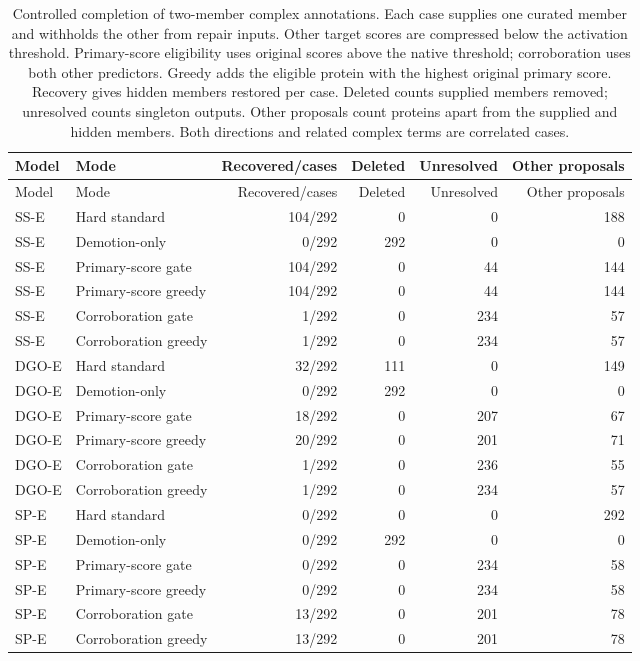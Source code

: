 \begingroup\scriptsize
\setlength{\tabcolsep}{4pt}
\begin{longtable}{llrrrr}
\caption{Controlled completion of two-member complex annotations. Each case supplies one curated member and withholds the other from repair inputs. Other target scores are compressed below the activation threshold. Primary-score eligibility uses original scores above the native threshold; corroboration uses both other predictors. Greedy adds the eligible protein with the highest original primary score. Recovery gives hidden members restored per case. Deleted counts supplied members removed; unresolved counts singleton outputs. Other proposals count proteins apart from the supplied and hidden members. Both directions and related complex terms are correlated cases.}\label{tab:supp-targeted-recovery}\\
\toprule
Model & Mode & Recovered/cases & Deleted & Unresolved & Other proposals \\
\midrule
\endfirsthead
\toprule
Model & Mode & Recovered/cases & Deleted & Unresolved & Other proposals \\
\midrule
\endhead
SS-E & Hard standard & 104/292 & 0 & 0 & 188 \\
SS-E & Demotion-only & 0/292 & 292 & 0 & 0 \\
SS-E & Primary-score gate & 104/292 & 0 & 44 & 144 \\
SS-E & Primary-score greedy & 104/292 & 0 & 44 & 144 \\
SS-E & Corroboration gate & 1/292 & 0 & 234 & 57 \\
SS-E & Corroboration greedy & 1/292 & 0 & 234 & 57 \\
DGO-E & Hard standard & 32/292 & 111 & 0 & 149 \\
DGO-E & Demotion-only & 0/292 & 292 & 0 & 0 \\
DGO-E & Primary-score gate & 18/292 & 0 & 207 & 67 \\
DGO-E & Primary-score greedy & 20/292 & 0 & 201 & 71 \\
DGO-E & Corroboration gate & 1/292 & 0 & 236 & 55 \\
DGO-E & Corroboration greedy & 1/292 & 0 & 234 & 57 \\
SP-E & Hard standard & 0/292 & 0 & 0 & 292 \\
SP-E & Demotion-only & 0/292 & 292 & 0 & 0 \\
SP-E & Primary-score gate & 0/292 & 0 & 234 & 58 \\
SP-E & Primary-score greedy & 0/292 & 0 & 234 & 58 \\
SP-E & Corroboration gate & 13/292 & 0 & 201 & 78 \\
SP-E & Corroboration greedy & 13/292 & 0 & 201 & 78 \\
\bottomrule
\end{longtable}
\endgroup
